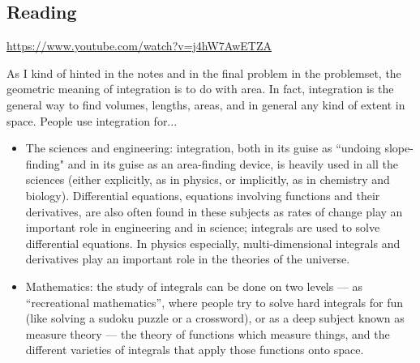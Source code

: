 



\subsection*{Reading}
\begin{center}
\begin{tcolorbox}[width=0.8\textwidth,colback={white},title={\textbf{Go and watch...}},colbacktitle=black,coltitle=white]
  \textcolor{black}{\url{https://www.youtube.com/watch?v=j4hW7AwETZA}}
\end{tcolorbox}
\end{center}

\begin{center}
\begin{tcolorbox}[width=0.8\textwidth,colback={white},title={\textbf{What's it good for?}},colbacktitle=MidnightBlue,coltitle=white]
  As I kind of hinted in the notes and in the final problem in the problemset, the geometric meaning of integration is to do with
  area. In fact, integration is the general way to find volumes, lengths, areas, and in general any kind of extent in space. People
  use integration for...
  \begin{itemize}
    \item The sciences and engineering: integration, both in its guise as ``undoing slope-finding" and in its guise as an area-finding
          device, is heavily used in all the sciences (either explicitly, as in physics, or implicitly, as in chemistry and biology).
          Differential equations, equations involving functions and their derivatives, are also often found in these subjects as rates
          of change play an important role in engineering and in science; integrals are used to solve differential equations. In physics
          especially, multi-dimensional integrals and derivatives play an important role in the theories of the universe.
    \item Mathematics: the study of integrals can be done on two levels --- as ``recreational mathematics'', where people try to solve
          hard integrals for fun (like solving a sudoku puzzle or a crossword), or as a deep subject known as measure theory --- the
          theory of functions which measure things, and the different varieties of integrals that apply those functions onto space.
  \end{itemize}
\end{tcolorbox}
\end{center}

